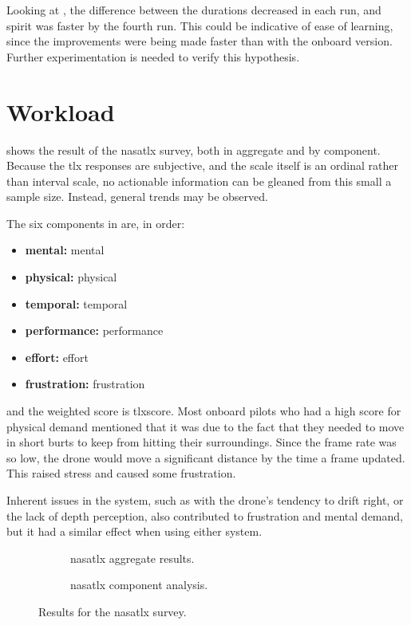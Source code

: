   Looking at , the difference between the durations decreased in each run, and \gls{spirit} was faster by the fourth run.
  This could be indicative of ease of learning, since the improvements were being made faster than with the onboard version.
  Further experimentation is needed to verify this hypothesis.

  \section{Workload}
   shows the result of the \gls{nasatlx} survey, both in aggregate and by component.
  Because the \gls{tlx} responses are subjective, and the scale itself is an ordinal rather than interval scale, no actionable information can be gleaned from this small a sample size.\cite{hart2006}
  Instead, general trends may be observed.

  The six components in  are, in order:

  \begin{itemize}
    \item \textbf{\acrshort{mental}:} \acrlong{mental}
    \item \textbf{\acrshort{physical}:} \acrlong{physical}
    \item \textbf{\acrshort{temporal}:} \acrlong{temporal}
    \item \textbf{\acrshort{performance}:} \acrlong{performance}
    \item \textbf{\acrshort{effort}:} \acrlong{effort}
    \item \textbf{\acrshort{frustration}:} \acrlong{frustration}
  \end{itemize}

  \noindent and the weighted score is \acrshort{tlxscore}.
  Most onboard pilots who had a high score for physical demand mentioned that it was due to the fact that they needed to move in short burts to keep from hitting their surroundings.
  Since the frame rate was so low, the drone would move a significant distance by the time a frame updated.
  This raised stress and caused some frustration.

  Inherent issues in the system, such as with the drone's tendency to drift right, or the lack of depth perception, also contributed to frustration and mental demand, but it had a similar effect when using either system.

  \begin{figure}[h]
    \centering
    \begin{subfigure}[b]{0.45\textwidth}
      
      \caption{\gls{nasatlx} aggregate results.}
      \label{fig:results}
    \end{subfigure}
    \hfill
    \begin{subfigure}[b]{0.45\textwidth}
      
      \caption{\gls{nasatlx} component analysis.}
      \label{fig:tlx_components}
    \end{subfigure}
    \caption[NASA-TLX results]{Results for the \gls{nasatlx} survey.}
    \label{fig:tlx}
  \end{figure}


